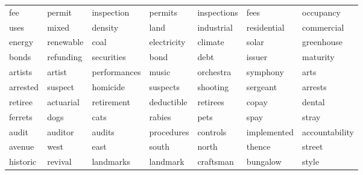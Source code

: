 \begin{table}[ht]
\begin{tabular}{lllllll}
  \cellcolor{red!10}fee & \cellcolor{red!10}permit & \cellcolor{red!10}inspection & \cellcolor{red!10}permits & \cellcolor{red!10}inspections & \cellcolor{red!10}fees & \cellcolor{red!10}occupancy \\ 
  \cellcolor{blue!10}uses & \cellcolor{blue!10}mixed & \cellcolor{blue!10}density & \cellcolor{blue!10}land & \cellcolor{blue!10}industrial & \cellcolor{blue!10}residential & \cellcolor{blue!10}commercial \\ 
  \cellcolor{red!10}energy & \cellcolor{red!10}renewable & \cellcolor{red!10}coal & \cellcolor{red!10}electricity & \cellcolor{red!10}climate & \cellcolor{red!10}solar & \cellcolor{red!10}greenhouse \\ 
  \cellcolor{blue!10}bonds & \cellcolor{blue!10}refunding & \cellcolor{blue!10}securities & \cellcolor{blue!10}bond & \cellcolor{blue!10}debt & \cellcolor{blue!10}issuer & \cellcolor{blue!10}maturity \\ 
  \cellcolor{red!20}artists & \cellcolor{red!20}artist & \cellcolor{red!20}performances & \cellcolor{red!20}music & \cellcolor{red!20}orchestra & \cellcolor{red!20}symphony & \cellcolor{red!20}arts \\ 
  \cellcolor{blue!80}arrested & \cellcolor{blue!80}suspect & \cellcolor{blue!80}homicide & \cellcolor{blue!80}suspects & \cellcolor{blue!80}shooting & \cellcolor{blue!80}sergeant & \cellcolor{blue!80}arrests \\ 
  \cellcolor{white}retiree & \cellcolor{white}actuarial & \cellcolor{white}retirement & \cellcolor{white}deductible & \cellcolor{white}retirees & \cellcolor{white}copay & \cellcolor{white}dental \\ 
  \cellcolor{red!10}ferrets & \cellcolor{red!10}dogs & \cellcolor{red!10}cats & \cellcolor{red!10}rabies & \cellcolor{red!10}pets & \cellcolor{red!10}spay & \cellcolor{red!10}stray \\ 
  \cellcolor{blue!10}audit & \cellcolor{blue!10}auditor & \cellcolor{blue!10}audits & \cellcolor{blue!10}procedures & \cellcolor{blue!10}controls & \cellcolor{blue!10}implemented & \cellcolor{blue!10}accountability \\ 
  \cellcolor{blue!10}avenue & \cellcolor{blue!10}west & \cellcolor{blue!10}east & \cellcolor{blue!10}south & \cellcolor{blue!10}north & \cellcolor{blue!10}thence & \cellcolor{blue!10}street \\ 
  \cellcolor{white}historic & \cellcolor{white}revival & \cellcolor{white}landmarks & \cellcolor{white}landmark & \cellcolor{white}craftsman & \cellcolor{white}bungalow & \cellcolor{white}style \\ 

\end{tabular}
\end{table}
